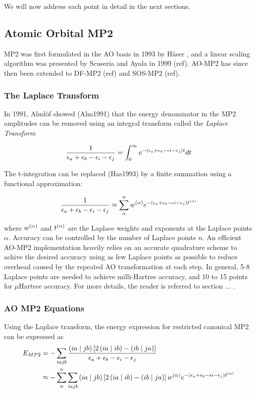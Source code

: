 We will now address each point in detail in the next sections.

\subsection{Atomic Orbital MP2}

MP2 was first formulated in the AO basis in 1993 by Häser , and a linear scaling algorithm was presented by Scuseria and Ayala in 1999 (ref). AO-MP2 has since then been extended to DF-MP2 (ref) and SOS-MP2 (ref). 

\subsubsection{The Laplace Transform}

In 1991, Almlöf showed (Alm1991) that the energy denominator in the MP2 amplitudes can be removed using an integral transform called the \emph{Laplace Transform}

\begin{equation}
\frac{1}{\epsilon_a + \epsilon_b - \epsilon_i - \epsilon_j} = \int_0^{\infty} e^{-\left(\epsilon_a + \epsilon_b - \epsilon i - \epsilon_j\right)t} dt
\end{equation}

The t-integration can be replaced (Has1993) by a finite summation using a functional approximation:

\begin{equation}
\frac{1}{\epsilon_a + \epsilon_b - \epsilon_i - \epsilon_j} \approx \sum_{\alpha}^{n} w^{(\alpha)} e^{-\left(\epsilon_a + \epsilon_b - \epsilon i - \epsilon_j\right)t^{(\alpha)}}
\end{equation} 

\noindent where $w^{(\alpha)}$ and $t^{(\alpha)}$ are the Laplace weights and exponents at the Laplace points $\alpha$. Accuracy can be controlled by the number of Laplace points $n$. An efficient AO-MP2 implementation heavily relies on an accurate quadrature scheme to achive the desired accuracy using as few Laplace points as possible to reduce overhead caused by the repeated AO transformation at each step. In general, 5-8 Laplace points are needed to achieve milli-Hartree accuracy, and 10 to 15 points for $\mu$Hartree accuracy. For more details, the reader is referred to section ... .

\subsubsection{AO MP2 Equations}

Using the Laplace transform, the energy expression for restricted canonical MP2 can be expressed as
\begin{equation}
\begin{split}
E_{MP2} &= - \sum_{iajb} \frac{\left( ia \mid jb \right) \left[2 \left( ia \mid ib \right) - \left( ib \mid ja \right) \right]}{\epsilon_a + \epsilon_b - \epsilon_i - \epsilon_j} \\
&\approx - \sum_{\alpha}^n \sum_{iajb} \left( ia \mid jb \right) \left[2 \left( ia \mid ib \right) - \left( ib \mid ja \right) \right] w^{(\alpha)} e^{-\left(\epsilon_a + \epsilon_b - \epsilon i - \epsilon_j\right)t^{(\alpha)}}
\end{split}
\end{equation}


